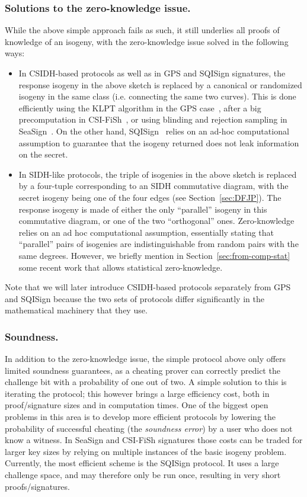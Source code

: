 \documentclass{llncs}
\begin{document}
\subsubsection{Solutions to the zero-knowledge issue.}
While the above simple approach fails  as such, it still underlies all proofs of knowledge of an isogeny, with the zero-knowledge issue solved in the following ways:
\begin{itemize}
    \item In CSIDH-based protocols as well as in GPS and SQISign signatures, the response isogeny in the above sketch is replaced by a canonical or randomized isogeny in the same class (i.e. connecting the same two curves). This is done efficiently using the KLPT algorithm in the GPS case~\cite{GPS20}, after a big precomputation in CSI-FiSh~\cite{CSI-FiSh}, or using blinding and rejection sampling in SeaSign~\cite{SeaSign}. On the other hand, SQISign~\cite{DFKLPW20} relies on an ad-hoc computational assumption to guarantee that the isogeny returned does not leak information on the secret.
%
    \item In SIDH-like protocols, the triple of isogenies in the above sketch is replaced by a four-tuple corresponding to an SIDH commutative diagram, with the secret isogeny being one of the four edges (see Section~\ref{sec:DFJP}).  The response isogeny is made of either the only ``parallel'' isogeny in this commutative diagram, or one of the two ``orthogonal'' ones. %
    Zero-knowledge relies on an ad hoc computational assumption, essentially stating that ``parallel'' pairs of isogenies are indistinguishable from random pairs with the same degrees.
    However, we briefly mention in Section~\ref{sec:from-comp-stat} some recent work that allows statistical zero-knowledge.
\end{itemize}

    Note that we will later introduce CSIDH-based protocols separately from GPS and SQISign because the two sets of protocols differ significantly in the mathematical machinery that they use.

\subsubsection{Soundness.} In addition to the zero-knowledge issue, the simple protocol above only offers limited soundness guarantees, as a cheating prover can correctly predict the challenge bit with a probability of one out of two. 
%
A simple solution to this is iterating the protocol; this however brings a large efficiency cost, both in proof/signature sizes and in computation times.
One of the biggest open problems in this area is to develop more efficient protocols by lowering the probability of successful cheating (the \emph{soundness error}) by a user who does not know a witness.
%
In SeaSign and CSI-FiSh signatures those costs can be traded for larger key sizes by relying on multiple instances of the basic isogeny problem.
%
Currently, the most efficient scheme is the SQISign protocol. It uses a large challenge space, and may therefore only be run once, resulting in very short proofs/signatures.
\end{document}
